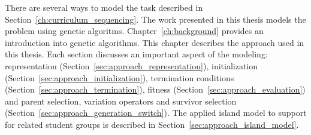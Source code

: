 There are several ways to model the task described in
Section~\ref{ch:curriculum_sequencing}. The work presented in this thesis models the
problem using genetic algoritms. Chapter~\ref{ch:background} provides an
introduction into genetic algorithms. This chapter describes the approach used
in this thesis. Each section discusses an important aspect of the modeling: representation
(Section~\ref{sec:approach_representation}), initialization
(Section~\ref{sec:approach_initialization}), termination conditions
(Section~\ref{sec:approach_termination}), fitness
(Section~\ref{sec:approach_evaluation}) and parent selection, variation
operators and survivor selection
(Section~\ref{sec:approach_generation_switch}). The applied island model to
support for related student groups is described in
Section~\ref{sec:approach_island_model}.

